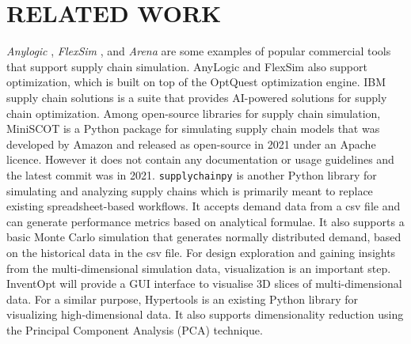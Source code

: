 \documentclass[a4paper,twoside]{article}
\begin{document}
\section{\uppercase{Related Work}}
\label{sec:relatedwork}
\textit{Anylogic} \cite{Anylogic},  \textit{FlexSim} \cite{Flexsim}, and \textit{Arena} \cite{Arena} are some examples of popular commercial tools that support supply chain simulation. AnyLogic and FlexSim also support optimization, which is built on top of the OptQuest \cite{OptQuest} optimization engine.  IBM supply chain solutions \cite{IBM} is a suite that provides AI-powered solutions for supply chain optimization. 
%
Among open-source libraries for supply chain simulation, MiniSCOT  \cite{miniSCOT} is a Python package for simulating supply chain models that was developed by Amazon and released as open-source in 2021 under an Apache licence. However it does not contain any documentation or usage guidelines and the latest commit was in 2021. \texttt{supplychainpy} \cite{Supplychainpy} is another Python library for simulating and analyzing supply chains which is primarily meant to replace existing spreadsheet-based workflows. 
It accepts demand data from a csv file and can generate performance metrics based on analytical formulae. It also supports a basic Monte Carlo simulation that generates normally distributed demand, based on the historical data in the csv file. 
%
For design exploration and gaining insights from the multi-dimensional simulation data, visualization is an important step. InventOpt will provide a GUI interface to visualise 3D slices of multi-dimensional data. For a similar purpose, Hypertools \cite{Hypertools} is an existing Python library for visualizing high-dimensional data. It also supports dimensionality reduction using the Principal Component Analysis (PCA) technique. 

 
\end{document}
